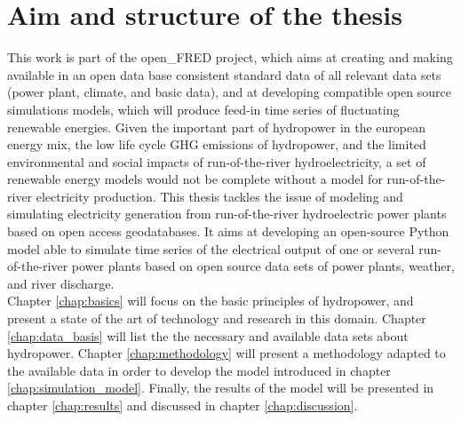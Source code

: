 \section{Aim and structure of the thesis}
This work is part of the open\_FRED project, which aims at creating and making available in an open data base consistent standard data of all relevant data sets (power plant, climate, and basic data), and at developing compatible open source simulations models, which will produce feed-in time series of fluctuating renewable energies. \newline
Given the important part of hydropower in the european energy mix, the low life cycle GHG emissions of hydropower, and the limited environmental and social impacts of run-of-the-river hydroelectricity, a set of renewable energy models would not be complete without a model for run-of-the-river electricity production. \newline
This thesis tackles the issue of modeling and simulating electricity generation from run-of-the-river hydroelectric power plants based on open access geodatabases. It aims at developing an open-source Python model able to simulate time series of the electrical output of one or several run-of-the-river power plants based on open source data sets of power plants, weather, and river discharge. \\
Chapter \ref{chap:basics} will focus on the basic principles of hydropower, and present a state of the art of technology and research in this domain. Chapter \ref{chap:data_basis} will list the the necessary and available data sets about hydropower. Chapter \ref{chap:methodology} will present a methodology adapted to the available data in order to develop the model introduced in chapter \ref{chap:simulation_model}. Finally, the results of the model will be presented in chapter \ref{chap:results} and discussed in chapter \ref{chap:discussion}.

